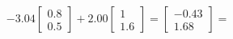 \documentclass[preview]{standalone}
\begin{document}
\begin{align*}
-3.04 \begin{bmatrix} 0.8 \\ 0.5 \end{bmatrix} + 2.00 \begin{bmatrix} 1 \\ 1.6 \end{bmatrix} = \begin{bmatrix} -0.43 \\ 1.68 \end{bmatrix} =
\end{align*}
\end{document}
